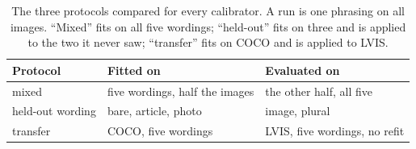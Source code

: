 \begin{table}[t]
\caption{The three protocols compared for every calibrator. A run is one phrasing on all
images. ``Mixed'' fits on all five wordings; ``held-out'' fits on three and is applied to the
two it never saw; ``transfer'' fits on COCO and is applied to LVIS.}\label{tab:protocols}
\begin{tabular*}{\textwidth}{@{\extracolsep{\fill}}lll@{}}
\toprule
Protocol & Fitted on & Evaluated on \\
\midrule
mixed & five wordings, half the images & the other half, all five \\
held-out wording & bare, article, photo & image, plural \\
transfer & COCO, five wordings & LVIS, five wordings, no refit \\
\bottomrule
\end{tabular*}
\end{table}
